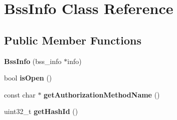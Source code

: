 \hypertarget{class_bss_info}{}\section{Bss\+Info Class Reference}
\label{class_bss_info}
\subsection*{Public Member Functions}
\begin{DoxyCompactItemize}
\item 
\hypertarget{class_bss_info_aec562770f28d1d9fcdd3b638ec0a6ecd}{}{\bfseries Bss\+Info} (bss\+\_\+info $\ast$info)\label{class_bss_info_aec562770f28d1d9fcdd3b638ec0a6ecd}

\item 
\hypertarget{class_bss_info_a0b7cfc6543a1057dc87bd83932dd6785}{}bool {\bfseries is\+Open} ()\label{class_bss_info_a0b7cfc6543a1057dc87bd83932dd6785}

\item 
\hypertarget{class_bss_info_aee47fe90704b37e0132ab3b845a30831}{}const char $\ast$ {\bfseries get\+Authorization\+Method\+Name} ()\label{class_bss_info_aee47fe90704b37e0132ab3b845a30831}

\item 
\hypertarget{class_bss_info_ad3f75400d8d164b64af11c995906bc7b}{}uint32\+\_\+t {\bfseries get\+Hash\+Id} ()\label{class_bss_info_ad3f75400d8d164b64af11c995906bc7b}

\end{DoxyCompactItemize}
